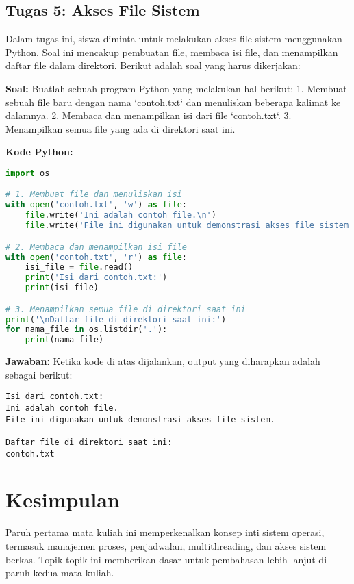 \documentclass{article}
\begin{document}
\subsection{Tugas 5: Akses File Sistem}
Dalam tugas ini, siswa diminta untuk melakukan akses file sistem menggunakan Python. Soal ini mencakup pembuatan file, membaca isi file, dan menampilkan daftar file dalam direktori. Berikut adalah soal yang harus dikerjakan:

\textbf{Soal:} Buatlah sebuah program Python yang melakukan hal berikut:
1. Membuat sebuah file baru dengan nama `contoh.txt` dan menuliskan beberapa kalimat ke dalamnya.
2. Membaca dan menampilkan isi dari file `contoh.txt`.
3. Menampilkan semua file yang ada di direktori saat ini.

\textbf{Kode Python:}
\begin{lstlisting}[language=Python]
import os

# 1. Membuat file dan menuliskan isi
with open('contoh.txt', 'w') as file:
    file.write('Ini adalah contoh file.\n')
    file.write('File ini digunakan untuk demonstrasi akses file sistem.\n')

# 2. Membaca dan menampilkan isi file
with open('contoh.txt', 'r') as file:
    isi_file = file.read()
    print('Isi dari contoh.txt:')
    print(isi_file)

# 3. Menampilkan semua file di direktori saat ini
print('\nDaftar file di direktori saat ini:')
for nama_file in os.listdir('.'):
    print(nama_file)
\end{lstlisting}

\textbf{Jawaban:} Ketika kode di atas dijalankan, output yang diharapkan adalah sebagai berikut:
\begin{verbatim}
Isi dari contoh.txt:
Ini adalah contoh file.
File ini digunakan untuk demonstrasi akses file sistem.

Daftar file di direktori saat ini:
contoh.txt
\end{verbatim}

\section{Kesimpulan}
Paruh pertama mata kuliah ini memperkenalkan konsep inti sistem operasi, termasuk manajemen proses, penjadwalan, multithreading, dan akses sistem berkas. Topik-topik ini memberikan dasar untuk pembahasan lebih lanjut di paruh kedua mata kuliah.
\end{document}
